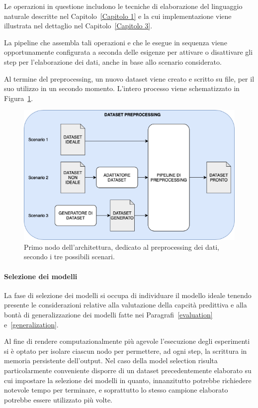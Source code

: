 \documentclass[12pt]{report}
\theoremstyle{definition}
\begin{document}
Le operazioni in questione includono le tecniche di elaborazione del linguaggio naturale descritte nel Capitolo~\ref{Capitolo 1} e la cui implementazione viene illustrata nel dettaglio nel Capitolo~\ref{Capitolo 3}.

La pipeline che assembla tali operazioni e che le esegue in sequenza viene opportunamente configurata a seconda delle esigenze per attivare o disattivare gli step per l'elaborazione dei dati, anche in base allo scenario considerato.

Al termine del preprocessing, un nuovo dataset viene creato e scritto su file, per il suo utilizzo in un secondo momento. L'intero processo viene schematizzato in Figura~\ref{preprocessmodule}.

\begin{figure}
    \centering
    \includegraphics[scale=0.6]{images/preprocessingmodule.png}
    \caption{Primo nodo dell'architettura, dedicato al preprocessing dei dati, secondo i tre possibili scenari.}
    \label{preprocessmodule}
\end{figure}

\paragraph{Selezione dei modelli}
La fase di selezione dei modelli si occupa di individuare il modello ideale tenendo presente le considerazioni relative alla valutazione della capcità predittiva e alla bontà di generalizzazione dei modelli fatte nei Paragrafi~\ref{evaluation} e~\ref{generalization}.

Al fine di rendere computazionalmente più agevole l'esecuzione degli esperimenti si è optato per isolare ciascun nodo per permettere, ad ogni step, la scrittura in memoria persistente dell'output. Nel caso della model selection risulta particolarmente conveniente disporre di un dataset precedentemente elaborato su cui impostare la selezione dei modelli in quanto, innanzitutto potrebbe richiedere notevole tempo per terminare, e soprattutto lo stesso campione elaborato potrebbe essere utilizzato più volte.
\end{document}
